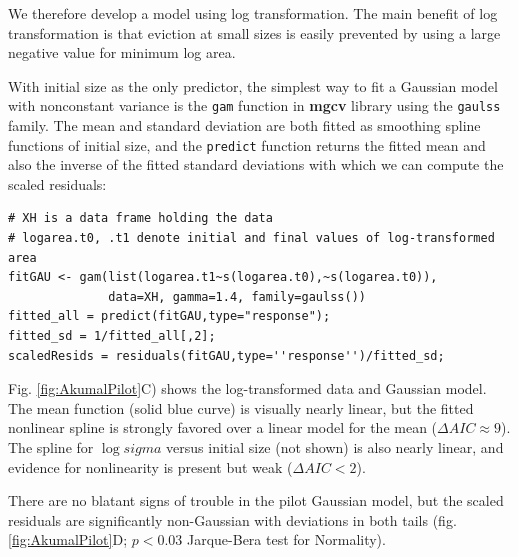 \documentclass[11pt]{article}
\newcommand{\tom}[2]{{\color{red}{#1}}\footnote{\textit{\color{red}{#2}}}}
\begin{document}
{We therefore develop a model using log transformation. The main benefit of log transformation is that 
eviction at small sizes is easily prevented by using a large negative value for minimum log area. 

With initial size as the only predictor, the simplest way to fit a Gaussian model with nonconstant variance is the
\texttt{gam} function in \textbf{mgcv} library \citep{wood-2017} using the \texttt{gaulss} family. The mean and 
standard deviation are both fitted as smoothing spline functions of initial size, and the \texttt{predict} function
returns the fitted mean and also the inverse of the fitted standard deviations with which we can compute the scaled residuals: 
\begin{lstlisting}
# XH is a data frame holding the data
# logarea.t0, .t1 denote initial and final values of log-transformed area   
fitGAU <- gam(list(logarea.t1~s(logarea.t0),~s(logarea.t0)),
              data=XH, gamma=1.4, family=gaulss())
fitted_all = predict(fitGAU,type="response"); 
fitted_sd = 1/fitted_all[,2]; 
scaledResids = residuals(fitGAU,type=''response'')/fitted_sd;  
\end{lstlisting}
Fig. \ref{fig:AkumalPilot}C) shows the log-transformed data and Gaussian model. The mean function (solid blue curve) 
is visually nearly linear, but the fitted nonlinear spline is strongly favored over a linear model for the mean ($\Delta AIC \approx 9$). 
The spline for $\log sigma$ versus initial size (not shown) is also nearly linear, and evidence for nonlinearity is present but 
weak ($\Delta AIC <2$). 

There are no blatant signs of trouble in the pilot Gaussian model, but the scaled residuals are 
significantly non-Gaussian with deviations in both tails (fig. \ref{fig:AkumalPilot}D; $p<0.03$ Jarque-Bera test for Normality).

}
\end{document}
